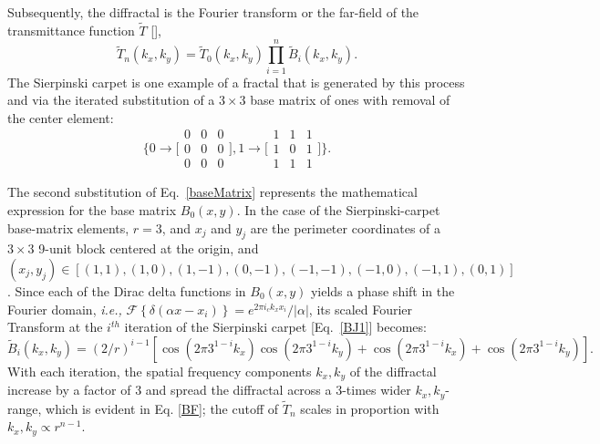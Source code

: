 Subsequently, the diffractal is the Fourier transform or the far-field of the transmittance function $\tilde{T}$ [\cite{Horvath}],
\begin{equation}
\tilde{T}_n(k_x,k_y) = \tilde{T}_0(k_x,k_y)\prod_{i=1}^{n}\tilde{B}_i(k_x,k_y)\label{FTn}.
\end{equation}
The Sierpinski carpet is one example of a fractal that is generated by this process and via the iterated substitution of a $3\times 3$ base matrix of ones with removal of the center element:
\begin{equation}
\Bigg\{0\rightarrow \Bigg[\begin{array}{ccc}
0 & 0 & 0 \\
0 & 0 & 0\\
0 & 0 & 0\end{array}\Bigg], 1\rightarrow\Bigg[\begin{array}{ccc}
1 & 1 & 1 \\
1 & 0 & 1\\
1 & 1 & 1\end{array}\Bigg] \Bigg\}.
\label{baseMatrix}
\end{equation}

The second substitution of Eq.~\ref{baseMatrix} represents the mathematical expression for the base matrix $B_0(x,y)$.  In the case of the Sierpinski-carpet base-matrix elements, $r=3$, and $x_j$ and $y_j$ are the perimeter coordinates of a $3\times 3$ 9-unit block centered at the origin, and $(x_j,y_j)\in [(1,1),(1,0),(1,-1),(0,-1),(-1,-1),(-1,0),(-1,1),(0,1)]$. Since each of the Dirac delta functions in $B_0(x,y)$ yields a phase shift in the Fourier domain, {\it i.e.,} $\mathscr{F}\left\{\delta(\alpha x-x_i)\right\} = e^{2\pi i_ck_xx_i}/|\alpha|$, its scaled Fourier Transform at the $i^{th}$ iteration of the Sierpinski carpet [Eq.~\ref{BJ1}] becomes:
\begin{equation}
\tilde{B}_i(k_x,k_y) = (2/r)^{i-1}[\cos(2\pi3^{1-i}k_x)\cos(2\pi3^{1-i}k_y)+\cos(2\pi 3^{1-i}k_x)+\cos(2\pi 3^{1-i}k_y)].\label{BF}
\end{equation}
With each iteration, the spatial frequency components $k_x,k_y$ of the diffractal increase by a factor of 3 and spread the diffractal across a 3-times wider $k_x,k_y$-range, which is evident in Eq. \ref{BF}; the cutoff of $\tilde{T}_n$ scales in proportion with $k_x, k_y \propto r^{n-1}$. 

